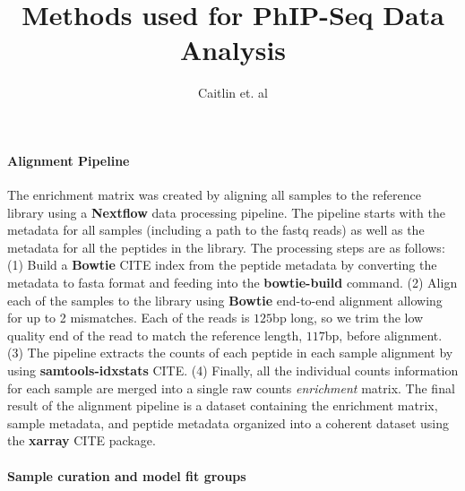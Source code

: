 \documentclass{article}
\title{Methods used for PhIP-Seq Data Analysis}
\author{Caitlin et. al}
\begin{document}
\maketitle


\paragraph{Alignment Pipeline}

The enrichment matrix was created by aligning all samples to the reference library using a \textbf{Nextflow} data processing pipeline.
The pipeline starts with the metadata for all samples (including a path to the fastq reads) 
as well as the metadata for all the peptides in the library.
The processing steps are as follows:
(1) Build a \textbf{Bowtie} CITE\cite{} index from the peptide metadata by converting the metadata to fasta format and feeding into the \textbf{bowtie-build} command.
(2) Align each of the samples to the library using \textbf{Bowtie} end-to-end alignment allowing for up to 2 mismatches. 
Each of the reads is $125$bp long, so we trim the low quality end of the read to match the reference length, $117$bp, before alignment.
(3) The pipeline extracts the counts of each peptide in each sample alignment by using \textbf{samtools-idxstats} CITE\cite{}.
(4) Finally, all the individual counts information for each sample are merged into a single raw counts \textit{enrichment} matrix.
The final result of the alignment pipeline is a dataset containing the enrichment matrix, sample metadata, and peptide metadata organized into a coherent 
dataset using the \textbf{xarray} CITE\cite{} package.

\paragraph{Sample curation and model fit groups}
\end{document}
